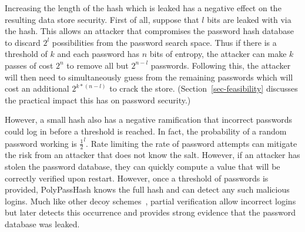 Increasing the length of the hash which is leaked has a negative 
effect on the resulting data store security.
First of all, suppose that $l$ bits are leaked with via the hash.
This allows an attacker that compromises the password hash database to 
discard $2^l$ possibilities from the password search space.   Thus
if there is a threshold of $k$ and each password has $n$ bits of entropy, 
the attacker can make $k$ passes of cost $2^n$ to remove all but $2^{n-l}$
passwords.   Following this, the attacker will then need to simultaneously
guess from the remaining passwords which will cost an additional $2^{k*(n-l)}$
to crack the store.   (Section~\ref{sec-feasibility} discusses the practical
impact this has on password security.)

However, a small hash also has a negative ramification that
incorrect passwords could log in before a threshold is reached.   In fact,
the probability of a random password working is $\frac{1}{2}^l$.   Rate
limiting the rate of password attempts can mitigate the risk from an attacker
that does not know the salt.   However, if an attacker has stolen the password 
database, they can quickly compute a value that will be correctly verified 
upon restart.  However, once a threshold of passwords is provided,
PolyPassHash knows the full hash and can detect any such
malicious logins.   Much like other decoy schemes~\cite{juels2013honeywords,
Kontaxis_CCS_2013}, partial verification allow incorrect logins but
later detects this occurrence and provides strong evidence that the password
database was leaked.






